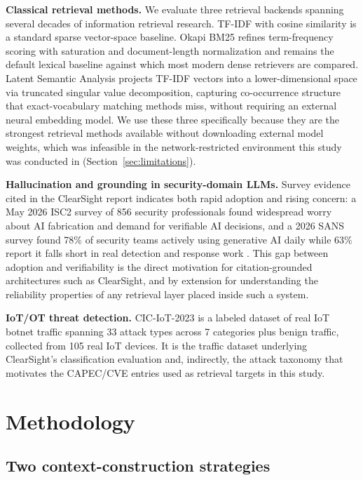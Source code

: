 \documentclass[11pt]{article}
\begin{document}
\textbf{Classical retrieval methods.} We evaluate three retrieval backends spanning several decades of information retrieval research. TF-IDF with cosine similarity is a standard sparse vector-space baseline. Okapi BM25 \citep{robertson2009bm25} refines term-frequency scoring with saturation and document-length normalization and remains the default lexical baseline against which most modern dense retrievers are compared. Latent Semantic Analysis \citep{deerwester1990lsa} projects TF-IDF vectors into a lower-dimensional space via truncated singular value decomposition, capturing co-occurrence structure that exact-vocabulary matching methods miss, without requiring an external neural embedding model. We use these three specifically because they are the strongest retrieval methods available without downloading external model weights, which was infeasible in the network-restricted environment this study was conducted in (Section~\ref{sec:limitations}).

\textbf{Hallucination and grounding in security-domain LLMs.} Survey evidence cited in the ClearSight report indicates both rapid adoption and rising concern: a May 2026 ISC2 survey of 856 security professionals found widespread worry about AI fabrication and demand for verifiable AI decisions, and a 2026 SANS survey found 78\% of security teams actively using generative AI daily while 63\% report it falls short in real detection and response work \citep{clearsight2026}. This gap between adoption and verifiability is the direct motivation for citation-grounded architectures such as ClearSight, and by extension for understanding the reliability properties of any retrieval layer placed inside such a system.

\textbf{IoT/OT threat detection.} CIC-IoT-2023 \citep{ciciot2023} is a labeled dataset of real IoT botnet traffic spanning 33 attack types across 7 categories plus benign traffic, collected from 105 real IoT devices. It is the traffic dataset underlying ClearSight's classification evaluation and, indirectly, the attack taxonomy that motivates the CAPEC/CVE entries used as retrieval targets in this study.

\section{Methodology}

\subsection{Two context-construction strategies}
\end{document}
